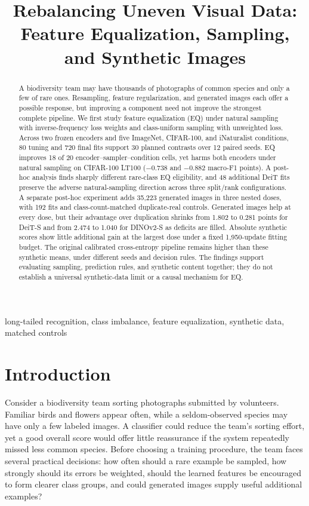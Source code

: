 \documentclass[conference]{IEEEtran}
\title{Rebalancing Uneven Visual Data:\\Feature Equalization, Sampling, and Synthetic Images}
\author{\IEEEauthorblockN{Savannah Shannon, Kishor Datta Gupta, and Roy George}}
\begin{document}
\maketitle
\begin{abstract}
A biodiversity team may have thousands of photographs of common species and only a few of rare ones. Resampling, feature regularization, and generated images each offer a possible response, but improving a component need not improve the strongest complete pipeline. We first study feature equalization (EQ) under natural sampling with inverse-frequency loss weights and class-uniform sampling with unweighted loss. Across two frozen encoders and five ImageNet, CIFAR-100, and iNaturalist conditions, 80 tuning and 720 final fits support 30 planned contrasts over 12 paired seeds. EQ improves 18 of 20 encoder--sampler--condition cells, yet harms both encoders under natural sampling on CIFAR-100 LT100 ($-0.738$ and $-0.882$ macro-F1 points). A post-hoc analysis finds sharply different rare-class EQ eligibility, and 48 additional DeiT fits preserve the adverse natural-sampling direction across three split/rank configurations. A separate post-hoc experiment adds 35,223 generated images in three nested doses, with 192 fits and class-count-matched duplicate-real controls. Generated images help at every dose, but their advantage over duplication shrinks from 1.802 to 0.281 points for DeiT-S and from 2.474 to 1.040 for DINOv2-S as deficits are filled. Absolute synthetic scores show little additional gain at the largest dose under a fixed 1,950-update fitting budget. The original calibrated cross-entropy pipeline remains higher than these synthetic means, under different seeds and decision rules. The findings support evaluating sampling, prediction rules, and synthetic content together; they do not establish a universal synthetic-data limit or a causal mechanism for EQ.
\end{abstract}
\begin{IEEEkeywords}
long-tailed recognition, class imbalance, feature equalization, synthetic data, matched controls
\end{IEEEkeywords}

\section{Introduction}
Consider a biodiversity team sorting photographs submitted by volunteers. Familiar birds and flowers appear often, while a seldom-observed species may have only a few labeled images. A classifier could reduce the team's sorting effort, yet a good overall score would offer little reassurance if the system repeatedly missed less common species. Before choosing a training procedure, the team faces several practical decisions: how often should a rare example be sampled, how strongly should its errors be weighted, should the learned features be encouraged to form clearer class groups, and could generated images supply useful additional examples?
\end{document}
